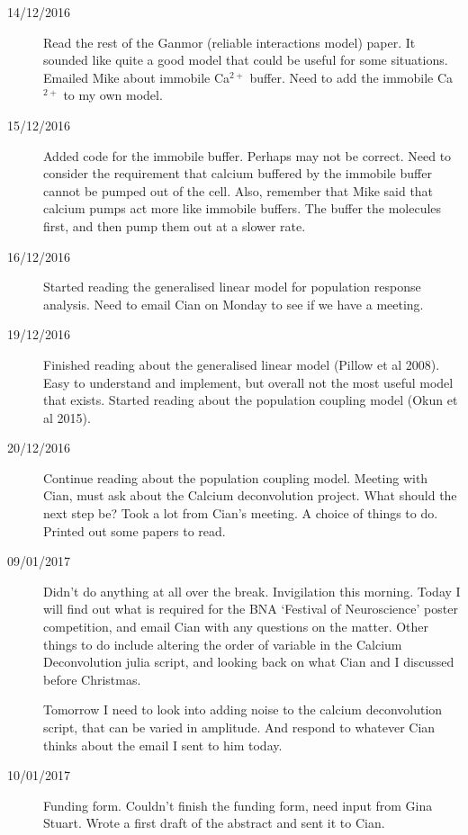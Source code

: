 \documentclass[a4paper,12pt]{article}
\theoremstyle{definition}
\begin{document}
\begin{description}
	\item[14/12/2016] Read the rest of the Ganmor (reliable interactions model) paper. It sounded like quite a good model that could be useful for some situations. Emailed Mike about immobile Ca$^{2+}$ buffer. Need to add the immobile Ca$^{2+}$ to my own model.

	\item[15/12/2016] Added code for the immobile buffer. Perhaps may not be correct. Need to consider the requirement that calcium buffered by the immobile buffer cannot be pumped out of the cell. Also, remember that Mike said that calcium pumps act more like immobile buffers. The buffer the molecules first, and then pump them out at a slower rate.

	\item[16/12/2016] Started reading the generalised linear model for population response analysis. Need to email Cian on Monday to see if we have a meeting.

	\item[19/12/2016] Finished reading about the generalised linear model (Pillow et al 2008). Easy to understand and implement, but overall not the most useful model that exists. Started reading about the population coupling model (Okun et al 2015).

	\item[20/12/2016] Continue reading about the population coupling model. Meeting with Cian, must ask about the Calcium deconvolution project. What should the next step be? Took a lot from Cian's meeting. A choice of things to do. Printed out some papers to read.

	\item[09/01/2017] Didn't do anything at all over the break. Invigilation this morning. Today I will find out what is required for the BNA `Festival of Neuroscience' poster competition, and email Cian with any questions on the matter. Other things to do include altering the order of variable in the Calcium Deconvolution julia script, and looking back on what Cian and I discussed before Christmas.

	Tomorrow I need to look into adding noise to the calcium deconvolution script, that can be varied in amplitude. And respond to whatever Cian thinks about the email I sent to him today.

	\item[10/01/2017] Funding form. Couldn't finish the funding form, need input from Gina Stuart. Wrote a first draft of the abstract and sent it to Cian.


\end{description}
\end{document}
